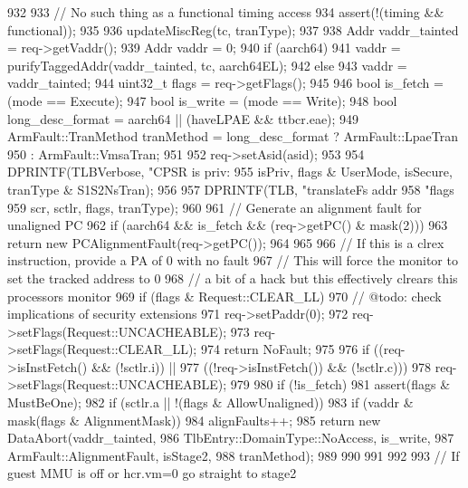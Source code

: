 \begin{DoxyCode}
932 {
933     // No such thing as a functional timing access
934     assert(!(timing && functional));
935 
936     updateMiscReg(tc, tranType);
937 
938     Addr vaddr_tainted = req->getVaddr();
939     Addr vaddr = 0;
940     if (aarch64)
941         vaddr = purifyTaggedAddr(vaddr_tainted, tc, aarch64EL);
942     else
943         vaddr = vaddr_tainted;
944     uint32_t flags = req->getFlags();
945 
946     bool is_fetch  = (mode == Execute);
947     bool is_write  = (mode == Write);
948     bool long_desc_format = aarch64 || (haveLPAE && ttbcr.eae);
949     ArmFault::TranMethod tranMethod = long_desc_format ? ArmFault::LpaeTran
950                                                        : ArmFault::VmsaTran;
951 
952     req->setAsid(asid);
953 
954     DPRINTF(TLBVerbose, "CPSR is priv:%
955             isPriv, flags & UserMode, isSecure, tranType & S1S2NsTran);
956 
957     DPRINTF(TLB, "translateFs addr %
958                  "flags %
959                  scr, sctlr, flags, tranType);
960 
961     // Generate an alignment fault for unaligned PC
962     if (aarch64 && is_fetch && (req->getPC() & mask(2))) {
963         return new PCAlignmentFault(req->getPC());
964     }
965 
966     // If this is a clrex instruction, provide a PA of 0 with no fault
967     // This will force the monitor to set the tracked address to 0
968     // a bit of a hack but this effectively clrears this processors monitor
969     if (flags & Request::CLEAR_LL){
970         // @todo: check implications of security extensions
971        req->setPaddr(0);
972        req->setFlags(Request::UNCACHEABLE);
973        req->setFlags(Request::CLEAR_LL);
974        return NoFault;
975     }
976     if ((req->isInstFetch() && (!sctlr.i)) ||
977         ((!req->isInstFetch()) && (!sctlr.c))){
978        req->setFlags(Request::UNCACHEABLE);
979     }
980     if (!is_fetch) {
981         assert(flags & MustBeOne);
982         if (sctlr.a || !(flags & AllowUnaligned)) {
983             if (vaddr & mask(flags & AlignmentMask)) {
984                 alignFaults++;
985                 return new DataAbort(vaddr_tainted,
986                                      TlbEntry::DomainType::NoAccess, is_write,
987                                      ArmFault::AlignmentFault, isStage2,
988                                      tranMethod);
989             }
990         }
991     }
992 
993     // If guest MMU is off or hcr.vm=0 go straight to stage2
}
\end{DoxyCode}
